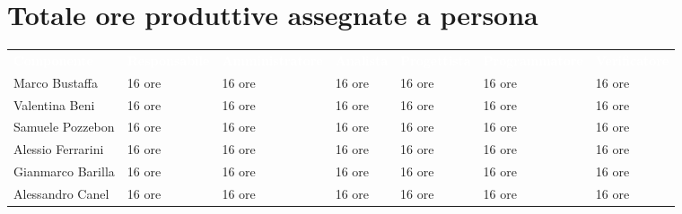 \section{Totale ore produttive assegnate a persona}
{\renewcommand{\arraystretch}{1.5}
\scriptsize
\begin{tabular}{p{2.5cm}p{2cm}p{2.3cm}p{1.3cm}p{2cm}p{2.3cm}p{2cm}}
	\rowcolor[RGB]{33, 73, 50}
	\textcolor{white}{\textbf{Componente}} & \textcolor{white}{\textbf{Responsabile}} & \textcolor{white}
	{\textbf{Amministratore}} & \textcolor{white}{\textbf{Analista}} & \textcolor{white}
	{\textbf{Progettista}} & \textcolor{white}{\textbf{Programmatore}} & \textcolor{white}{\textbf{Verificatore}}\\
	\rowcolor[RGB]{216, 235, 171}
	Marco Bustaffa & 16 ore & 16 ore & 16 ore & 16 ore & 16 ore & 16 ore        \\
	\rowcolor[RGB]{233, 245, 206}
	Valentina Beni & 16 ore & 16 ore & 16 ore & 16 ore & 16 ore & 16 ore        \\
	\rowcolor[RGB]{216, 235, 171}
	Samuele Pozzebon & 16 ore & 16 ore & 16 ore & 16 ore & 16 ore & 16 ore      \\
    \rowcolor[RGB]{233, 245, 206}
	Alessio Ferrarini & 16 ore & 16 ore & 16 ore & 16 ore & 16 ore & 16 ore     \\
    \rowcolor[RGB]{216, 235, 171}
	Gianmarco Barilla & 16 ore & 16 ore & 16 ore & 16 ore & 16 ore & 16 ore     \\
    \rowcolor[RGB]{233, 245, 206}
	Alessandro Canel & 16 ore & 16 ore & 16 ore & 16 ore & 16 ore & 16 ore    	\\
\end{tabular}	
}